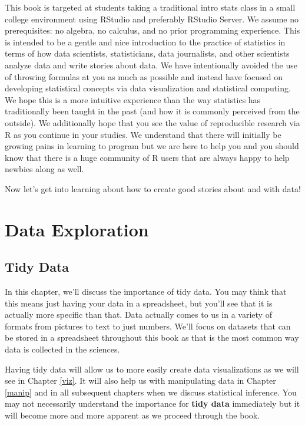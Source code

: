 \documentclass[]{tufte-book}
\theoremstyle{definition}
\theoremstyle{definition}
\theoremstyle{remark}
\begin{document}
This book is targeted at students taking a traditional intro stats class
in a small college environment using RStudio and preferably RStudio
Server. We assume no prerequisites: no algebra, no calculus, and no
prior programming experience. This is intended to be a gentle and nice
introduction to the practice of statistics in terms of how data
scientists, statisticians, data journalists, and other scientists
analyze data and write stories about data. We have intentionally avoided
the use of throwing formulas at you as much as possible and instead have
focused on developing statistical concepts via data visualization and
statistical computing. We hope this is a more intuitive experience than
the way statistics has traditionally been taught in the past (and how it
is commonly perceived from the outside). We additionally hope that you
see the value of reproducible research via R as you continue in your
studies. We understand that there will initially be growing pains in
learning to program but we are here to help you and you should know that
there is a huge community of R users that are always happy to help
newbies along as well.

Now let's get into learning about how to create good stories about and
with data!

\part{Data Exploration}\label{part-data-exploration}

\chapter{Tidy Data}\label{tidy}

In this chapter, we'll discuss the importance of tidy data. You may
think that this means just having your data in a spreadsheet, but you'll
see that it is actually more specific than that. Data actually comes to
us in a variety of formats from pictures to text to just numbers. We'll
focus on datasets that can be stored in a spreadsheet throughout this
book as that is the most common way data is collected in the sciences.

Having tidy data will allow us to more easily create data visualizations
as we will see in Chapter \ref{viz}. It will also help us with
manipulating data in Chapter \ref{manip} and in all subsequent chapters
when we discuss statistical inference. You may not necessarily
understand the importance for \textbf{tidy data} immediately but it will
become more and more apparent as we proceed through the book.
\end{document}
